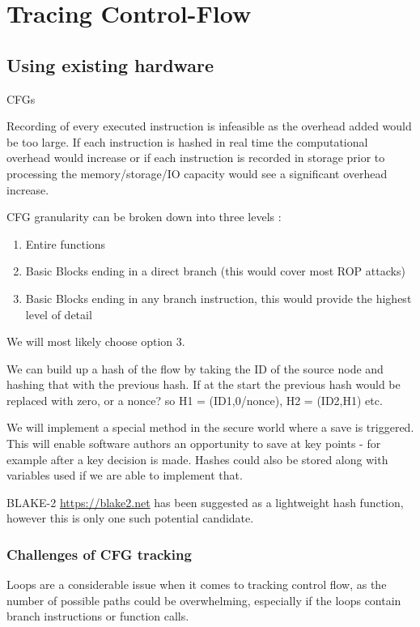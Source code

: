 \section{Tracing Control-Flow}

\subsection{Using existing hardware}

CFGs 

Recording of every executed instruction is infeasible as the overhead added would be too large. If each instruction is hashed in real time the computational overhead would increase or if each instruction is recorded in storage prior to processing the memory\slash storage\slash IO capacity would see a significant overhead increase.

CFG granularity can be broken down into three levels \cite{Abera2016}:
\begin{enumerate}
	\item{Entire functions}
	\item{Basic Blocks ending in a direct branch (this would cover most ROP attacks)}
	\item{Basic Blocks ending in any branch instruction, this would provide the highest level of detail}
\end{enumerate}

We will most likely choose option 3.

We can build up a hash of the flow by taking the ID of the source node and hashing that with the previous hash. If at the start the previous hash would be replaced with zero, or a nonce? so H1 = (ID1,0/nonce), H2 = (ID2,H1) etc.

We will implement a special method in the secure world where a save is triggered. This will enable software authors an opportunity to save at key points - for example after a key decision is made. Hashes could also be stored along with variables used if we are able to implement that.

BLAKE-2 \url{https://blake2.net} has been suggested as a lightweight hash function, however this is only one such potential candidate.

\subsubsection{Challenges of CFG tracking}

Loops are a considerable issue when it comes to tracking control flow, as the number of possible paths could be overwhelming, especially if the loops contain branch instructions or function calls.

